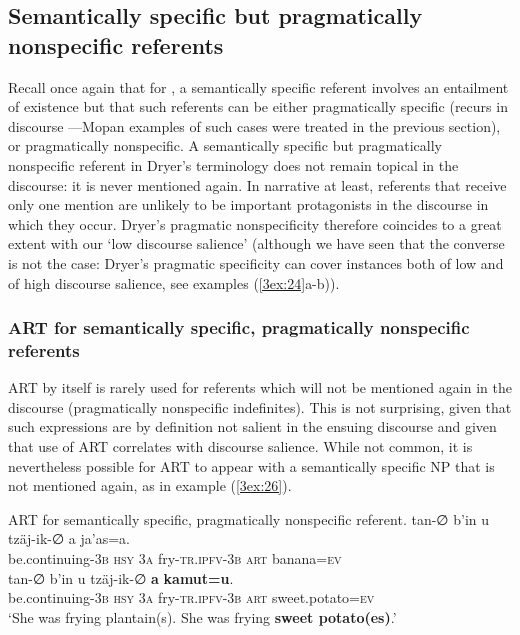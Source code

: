 \documentclass[output=paper]{langsci/langscibook}
\begin{document}
\subsection{Semantically specific but pragmatically nonspecific referents}\label{3sec:34}

Recall once again that for \cite{dryer:14}, a semantically specific referent involves an entailment of existence but that such referents can be either pragmatically specific (recurs in discourse ---Mopan examples of such cases were treated in the previous section), or pragmatically nonspecific. A semantically specific but pragmatically nonspecific referent in Dryer's terminology does not remain topical in the discourse: it is never mentioned again. In narrative at least, referents that receive only one mention are unlikely to be important protagonists in the discourse in which they occur. Dryer's pragmatic nonspecificity therefore coincides to a great extent with our `low discourse salience' (although we have seen that the converse is not the case: Dryer's pragmatic specificity can cover instances both of low and of high discourse salience, see examples (\ref{3ex:24}a-b)).

\subsubsection{ART for semantically specific, pragmatically nonspecific referents}\label{3sec:341}

ART by itself is rarely used for referents which will not be mentioned again in the discourse (pragmatically nonspecific indefinites).  This is not surprising, given that such expressions are by definition not salient in the ensuing discourse and given that use of ART correlates with discourse salience.  While not common, it is nevertheless possible for ART to appear with a semantically specific NP that is not mentioned again, as in example (\ref{3ex:26}).

\begin{exe}
\ex\label{3ex:26}
ART for semantically specific, pragmatically nonspecific referent. 
\exi{}
\gll	tan-{∅}				b'in		u		tz\"aj-ik-{∅}		a	ja'as=a. \\
	be.continuing-{\textsc{3b}}	{\textsc{hsy}}	{\textsc{3a}}	fry-{\textsc{tr.ipfv-3b}}	{\textsc{art}}	banana={\textsc{ev}} \\
\glt
\exi{}
\gll	tan-{∅}				b'in		u		tz\"aj-ik-{∅}		{\textbf{a}}	{\textbf{kamut=u}}. \\
	be.continuing-{\textsc{3b}}	{\textsc{hsy}}	{\textsc{3a}}	fry-{\textsc{tr.ipfv-3b}}	{\textsc{art}}		sweet.potato={\textsc{ev}} \\
\glt	`She was frying plantain(s).  She was frying {\textbf{sweet potato(es)}}.'
\end{exe}
\end{document}
